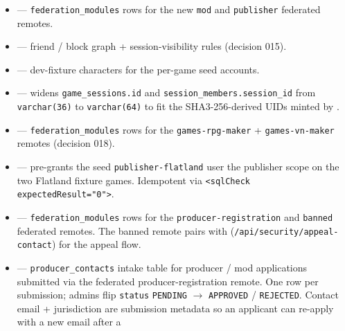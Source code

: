 \begin{itemize}
        for per-game RBAC; per-game seeded users wired to natural
        scope rows.
  \item {} —
        \texttt{federation\_modules} rows for the new \texttt{mod} and
        \texttt{publisher} federated remotes.
  \item {} —
        friend / block graph + session-visibility rules (decision 015).
  \item {} —
        dev-fixture characters for the per-game seed accounts.
  \item {} —
        widens \texttt{game\_sessions.id} and
        \texttt{session\_members.session\_id} from \texttt{varchar(36)}
        to \texttt{varchar(64)} to fit the SHA3-256-derived UIDs minted
        by .
  \item {} —
        \texttt{federation\_modules} rows for the
        \texttt{games-rpg-maker} + \texttt{games-vn-maker} remotes
        (decision 018).
  \item {} —
        pre-grants the seed \texttt{publisher-flatland} user the
        publisher scope on the two Flatland fixture games. Idempotent
        via \texttt{<sqlCheck expectedResult="0">}.
  \item {} —
        \texttt{federation\_modules} rows for the
        \texttt{producer-registration} and \texttt{banned} federated
        remotes. The banned remote pairs with
        (\texttt{/api/security/appeal-contact}) for the appeal flow.
  \item {} —
        \texttt{producer\_contacts} intake table for producer / mod
        applications submitted via the federated producer-registration
        remote. One row per submission; admins flip
        \texttt{status} \texttt{PENDING} $\rightarrow$ \texttt{APPROVED}
        / \texttt{REJECTED}. Contact email + jurisdiction are submission
        metadata so an applicant can re-apply with a new email after a

\end{itemize}
